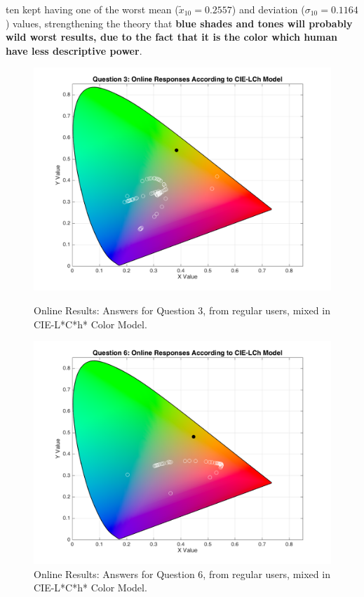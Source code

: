 ten kept having one of the worst mean ($\tilde{x}_{10} = 0.2557$) and deviation ($\sigma_{10} = 0.1164$) values, strengthening the theory that \textbf{blue shades and tones will probably wild worst results, due to the fact
that it is the color which human have less descriptive power}. \par
%
\begin{figure}[!htbp]
  \centering
  \begin{minipage}{0.48\textwidth}
    \centering
    \includegraphics[width=\textwidth]{images/3_online_LChresponses.png}
    \caption[Online Results: Answers for Question 3, from regular users, mixed in CIE-L*C*h* Color Model.]{Online Results: Answers for Question 3, from regular users, mixed in CIE-L*C*h* Color Model.}
    \label{fig:onlinelchregular_3}
  \end{minipage}\hfill
  \begin{minipage}{0.48\textwidth}
    \centering
    \includegraphics[width=\textwidth]{images/6_online_LChresponses.png}
    \caption[Online Results: Answers for Question 6, from regular users, mixed in CIE-L*C*h* Color Model.]{Online Results: Answers for Question 6, from regular users, mixed in CIE-L*C*h* Color Model.}
    \label{fig:onlinelchregular_6}
  \end{minipage}
\end{figure}
